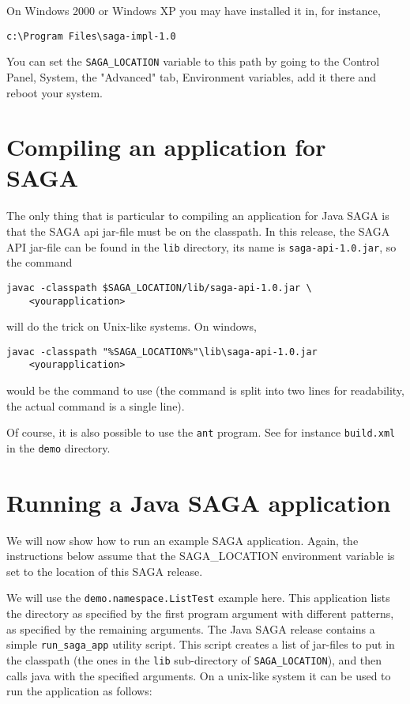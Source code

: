 \documentclass[a4paper,10pt]{article}
\begin{document}
On Windows 2000 or Windows XP you may have installed it in, for instance,
\noindent
{\small
\begin{verbatim}
c:\Program Files\saga-impl-1.0
\end{verbatim}
}
\noindent
You can set the \texttt{SAGA\_LOCATION} variable to this path by going to the
Control Panel, System, the "Advanced" tab, Environment variables,
add it there and reboot your system.

\section{Compiling an application for SAGA}

The only thing that is particular to compiling an application for
Java SAGA is that the SAGA api jar-file must be on the classpath.
In this release, the SAGA API jar-file can be found
in the \texttt{lib} directory, its name is \texttt{saga-api-1.0.jar}, so
the command
\noindent
{\small
\begin{verbatim}
javac -classpath $SAGA_LOCATION/lib/saga-api-1.0.jar \
    <yourapplication>
\end{verbatim}
}
\noindent
will do the trick on Unix-like systems. On windows,
\noindent
{\small
\begin{verbatim}
javac -classpath "%SAGA_LOCATION%"\lib\saga-api-1.0.jar
    <yourapplication>
\end{verbatim}
}
\noindent
would be the command to use (the command is split into two lines for
readability, the actual command is a single line).

Of course, it is also possible to use the \texttt{ant} program.
See for instance \texttt{build.xml} in the \texttt{demo} directory.

\section{Running a Java SAGA application}

We will now show how to run an example SAGA application.
Again, the instructions below assume that the SAGA\_LOCATION
environment variable is set to the location of this SAGA release.

We will use the \texttt{demo.namespace.ListTest} example here.
This application lists the directory as specified by the first
program argument with different patterns, as specified by the
remaining arguments.
The Java SAGA release contains a simple \texttt{run\_saga\_app} utility script.
This script creates a list of jar-files to put in the classpath (the
ones in the \texttt{lib} sub-directory of \texttt{SAGA\_LOCATION}),
and then calls java with the specified arguments.
On a unix-like system it can be used to run the application as follows:
\end{document}
